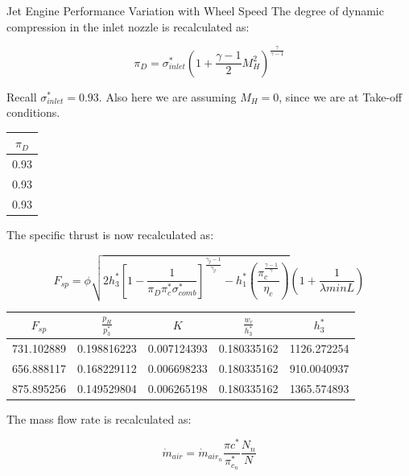 \documentclass[titlepage]{article}
\begin{document}
\begin{section}{Jet Engine Performance Variation with Wheel Speed}
The degree of dynamic compression in the inlet nozzle is recalculated as:

\begin{equation}
  \pi_{D} = \sigma_{inlet}^{*} \left( 1+\frac{\gamma - 1}{2}M_{H}^{2}\right)^{\frac{\gamma}{\gamma - 1}}
\end{equation}

Recall $\sigma_{inlet}^{*} = 0.93$. Also here we are assuming $M_{H} = 0$, since we are at Take-off conditions.

\begin{center}
  \begin{tabular}{|c|}
    \hline
    $\pi_{D}$ \\
    \hline
    0.93 \\
    \hline
    0.93 \\
    \hline
    0.93 \\
    \hline
  \end{tabular}
\end{center}

The specific thrust is now recalculated as:

\begin{equation}
  F_{sp} = \phi \sqrt{2h_{3}^{*}\left[1 - \frac{1}{\pi_{D} \pi_{c}^{*} \sigma_{comb}^{*}}\right]^{\frac{\gamma_{g}-1}{\gamma_{g}}} - h_{1}^{*}\left(\frac{\pi_{c}^{\frac{\gamma-1}{\gamma}}}{\eta_{c}}\right)} \left(1+\frac{1}{\lambda minL}\right)
\end{equation}

\begin{center}
  \begin{tabular}{|c|c|c|c|c|}
    \hline
    $F_{sp}$ & $\frac{p_{H}}{p_{3}^{*}}$ & $K$ & $\frac{w_{c}}{h_{3}^{*}}$ & $h_{3}^{*}$ \\
    \hline
    731.102889 & 0.198816223	& 0.007124393 &	0.180335162	& 1126.272254 \\
    \hline
    656.888117 & 0.168229112	& 0.006698233	& 0.180335162	& 910.0040937 \\
    \hline
    875.895256 & 0.149529804 & 0.006265198	& 0.180335162	& 1365.574893 \\
    \hline
  \end{tabular}
\end{center}

The mass flow rate is recalculated as:

\begin{equation}
  \dot{m}_{air} = \dot{m}_{air_{n}} \frac{\pi{c}^{*}}{\pi_{c_{n}}^{*}} \frac{N_{n}}{N}
\end{equation}


\end{section}
\end{document}
